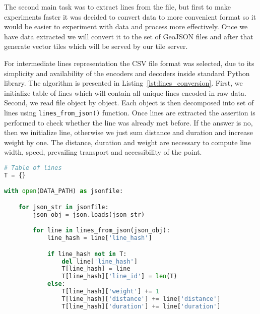 The second main task was to extract lines from the file, but first to make experiments faster
it was decided to convert data to more convenient format so it would be easier to
experiment with data and process more effectively. Once we have data extracted we will convert it
to the set of GeoJSON files and after that generate vector tiles which will be served by our
tile server.

For intermediate lines representation the CSV file format was selected, due to its simplicity
and availability of the encoders and decoders inside standard Python library. The algorithm is
presented in Listing~\ref{lst:lines_conversion}. First, we initialize table of lines which will
contain all unique lines encoded in raw data. Second, we read file object by object. Each object
is then decomposed into set of lines using \lstinline|lines_from_json()| function. Once lines are
extracted the assertion is performed to check whether the line was already met before. If the
answer is no, then we initialize line, otherwise we just sum distance and duration
and increase weight by one. The distance, duration and weight are necessary to compute
line width, speed, prevailing transport and accessibility of the point.

\begin{lstlisting}[language=python, caption=Lines conversion., label={lst:lines_conversion}]
# Table of lines
T = {}

with open(DATA_PATH) as jsonfile:

    for json_str in jsonfile:
        json_obj = json.loads(json_str)

        for line in lines_from_json(json_obj):
            line_hash = line['line_hash']

            if line_hash not in T:
                del line['line_hash']
                T[line_hash] = line
                T[line_hash]['line_id'] = len(T)
            else:
                T[line_hash]['weight'] += 1
                T[line_hash]['distance'] += line['distance']
                T[line_hash]['duration'] += line['duration']
\end{lstlisting}


